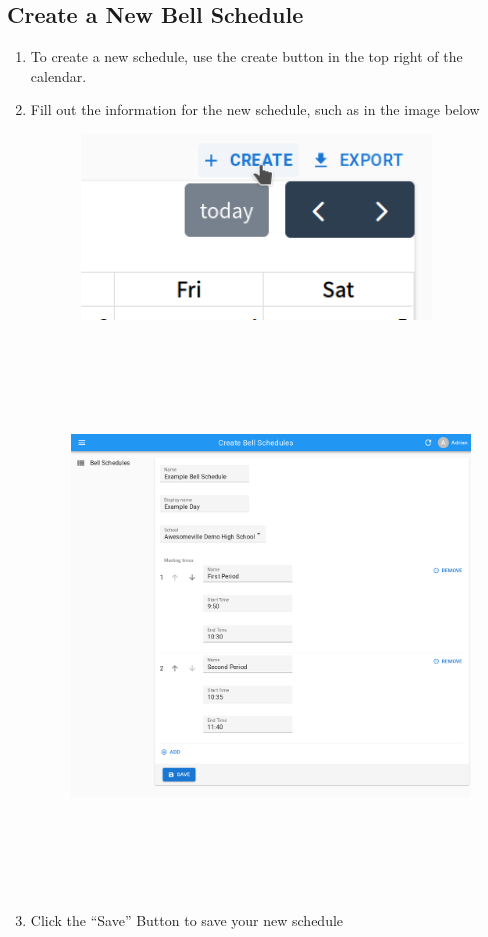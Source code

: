 \documentclass{article}
\begin{document}
\begin{enumerate}
\end{enumerate}
\subsection{Create a New Bell Schedule}
\begin{enumerate}
\item {To create a new schedule, use the create button in the top right of the calendar.}
\item {Fill out the information for the new schedule, such as in the image below}
\begin{figure}
\includegraphics[width=3.8693in,height=1.9382in]{Mini20Manual-img010.png}\end{figure}
\begin{figure}
\includegraphics[width=6.5in,height=5.7717in]{Mini20Manual-img011.png}\end{figure}
\item {Click the “Save” Button to save your new schedule}
\end{enumerate}
\end{document}
